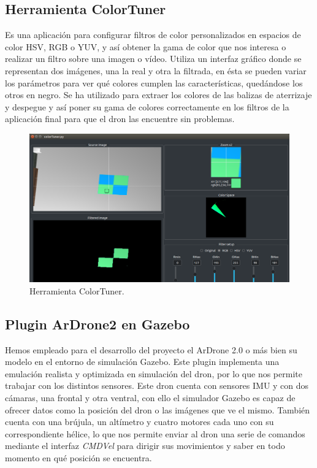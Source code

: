 \subsection{Herramienta ColorTuner}
\hspace{1cm} Es una aplicación para configurar filtros de color personalizados en espacios de color HSV, RGB o YUV, y así obtener la gama de color que nos interesa o realizar un filtro sobre una imagen o vídeo. Utiliza un interfaz gráfico donde se representan dos imágenes, una la real y otra la filtrada, en ésta se pueden variar los parámetros para ver qué colores cumplen las características, quedándose los otros en negro. Se ha utilizado para extraer los colores de las balizas de aterrizaje y despegue y así poner su gama de colores correctamente en los filtros de la aplicación final para que el dron las encuentre sin problemas.

\begin{figure}[H]
	\begin{center}
		\includegraphics[width=1\textwidth]{imag/IMG27.png}
				\caption{Herramienta ColorTuner.} 
	\label{fig:ColorTuner.}	
	\end{center}
\end{figure}

\subsection{Plugin ArDrone2 en Gazebo}
\hspace{1cm} Hemos empleado para el desarrollo del proyecto el ArDrone 2.0 o más bien su modelo en el entorno de simulación Gazebo. Este plugin implementa una emulación realista y optimizada en simulación del dron, por lo que nos permite trabajar con los distintos sensores. Este dron cuenta con sensores IMU y con dos cámaras, una frontal y otra ventral, con ello el simulador Gazebo es capaz de ofrecer datos como la posición del dron o las imágenes que ve el mismo. También cuenta con una brújula, un altímetro y cuatro motores cada uno con su correspondiente hélice, lo que nos permite enviar al dron una serie de comandos mediante el interfaz \textit{CMDVel} para dirigir sus movimientos y saber en todo momento en qué posición se encuentra.

